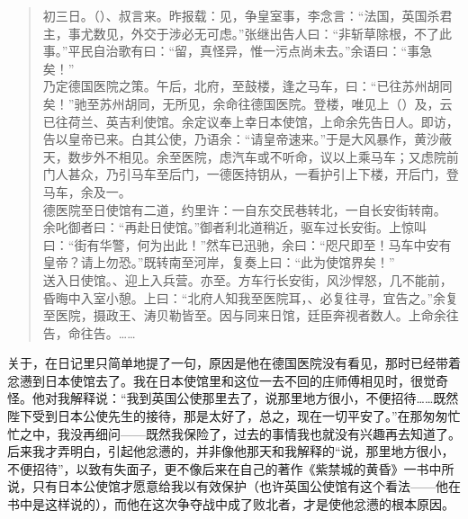 \begin{quote}
	初三日。（）、叔言来。昨报载：见，争皇室事，李念言：“法国，英国杀君主，事尤数见，外交于涉必无可虑。”张继出告人曰：“非斩草除根，不了此事。”平民自治歌有曰：“留，真怪异，惟一污点尚未去。”余语曰：“事急矣！”\\

乃定德国医院之策。午后，北府，至鼓楼，逢之马车，曰：“已往苏州胡同矣！”驰至苏州胡同，无所见，余命往德国医院。登楼，唯见上（）及，云已往荷兰、英吉利使馆。余定议奉上幸日本使馆，上命余先告日人。即访，告以皇帝已来。白其公使，乃语余：“请皇帝速来。”于是大风暴作，黄沙蔽天，数步外不相见。余至医院，虑汽车或不听命，议以上乘马车；又虑院前门人甚众，乃引马车至后门，一德医持钥从，一看护引上下楼，开后门，登马车，余及一。\\

德医院至日使馆有二道，约里许：一自东交民巷转北，一自长安街转南。\\

余叱御者曰：“再赴日使馆。”御者利北道稍近，驱车过长安街。上惊叫曰：“街有华警，何为出此！”然车已迅驰，余曰：“咫尺即至！马车中安有皇帝？请上勿恐。”既转南至河岸，复奏上曰：“此为使馆界矣！”\\

送入日使馆。、迎上入兵营。亦至。方车行长安街，风沙悍怒，几不能前，昏晦中入室小憩。上曰：“北府人知我至医院耳，、必复往寻，宜告之。”余复至医院，摄政王、涛贝勒皆至。因与同来日馆，廷臣奔视者数人。上命余往告，命往告。……\\
\end{quote}

关于，在日记里只简单地提了一句，原因是他在德国医院没有看见，那时已经带着忿懑到日本使馆去了。我在日本使馆里和这位一去不回的庄师傅相见时，很觉奇怪。他对我解释说：“我到英国公使那里去了，说那里地方很小，不便招待……既然陛下受到日本公使先生的接待，那是太好了，总之，现在一切平安了。”在那匆匆忙忙之中，我没再细问——既然我保险了，过去的事情我也就没有兴趣再去知道了。后来我才弄明白，引起他忿懑的，并非像他那天和我解释的“说，那里地方很小，不便招待”，以致有失面子，更不像后来在自己的著作《紫禁城的黄昏》一书中所说，只有日本公使馆才愿意给我以有效保护（也许英国公使馆有这个看法——他在书中是这样说的），而他在这次争夺战中成了败北者，才是使他忿懑的根本原因。\\


